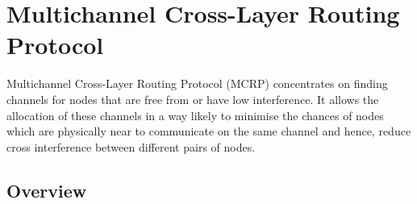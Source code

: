 \section{Multichannel Cross-Layer Routing Protocol}
\label{sec:multichannel}

Multichannel Cross-Layer Routing Protocol (MCRP) concentrates on finding channels for nodes that are free from or have low interference. It allows the allocation of these channels in a way likely to minimise the chances of nodes which are physically near to communicate on the same channel and hence, reduce cross interference between different pairs of nodes.

\subsection{Overview}

